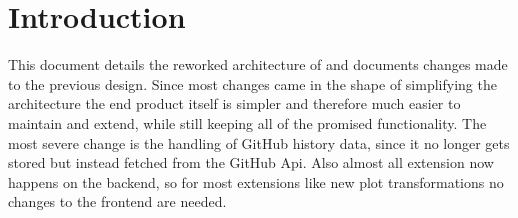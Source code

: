 \section{Introduction}

This document details the reworked architecture of \parkview{} and documents changes made to the previous design. Since most changes came in the shape of simplifying the architecture the end product itself is simpler and therefore much easier to maintain and extend, while still keeping all of the promised functionality. The most severe change is the handling of GitHub history data, since it no longer gets stored but instead fetched from the GitHub Api. Also almost all extension now happens on the backend, so for most extensions like new plot transformations no changes to the frontend are needed.
